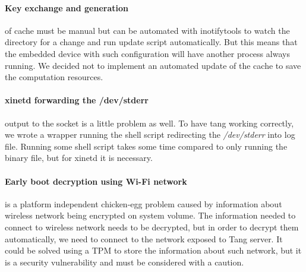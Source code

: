 \paragraph{Key exchange and generation} of cache must be manual but can be automated with inotifytools to watch the directory for a change and run update script automatically.
But this means that the embedded device with such configuration will have another process always running.
We decided not to implement an automated update of the cache to save the computation resources.

\paragraph{xinetd forwarding the /dev/stderr} output to the socket is a little problem as well.
To have tang working correctly, we wrote a wrapper running the shell script redirecting the {\it /dev/stderr} into log file.
Running some shell script takes some time compared to only running the binary file, but for xinetd it is necessary.

\paragraph{Early boot decryption using Wi-Fi network} is a platform independent chicken-egg problem caused by information about wireless network being encrypted on system volume.
The information needed to connect to wireless network needs to be decrypted, but in order to decrypt them automatically, we need to connect to the network exposed to Tang server.
It could be solved using a TPM to store the information about such network, but it is a security vulnerability and must be considered with a caution.

